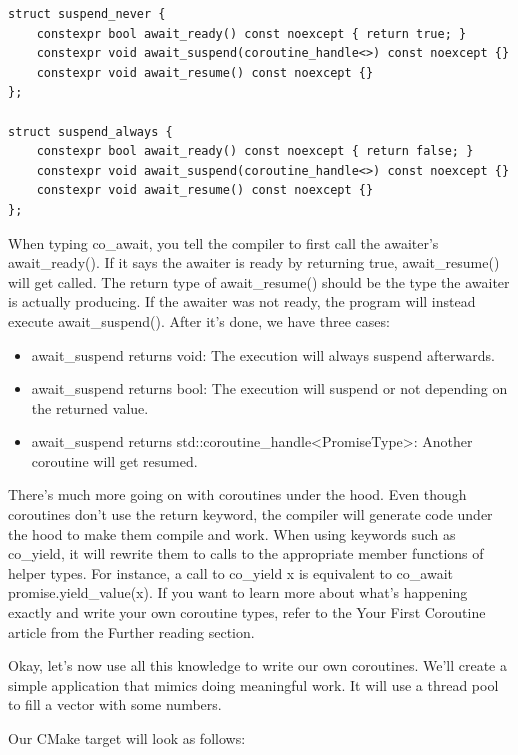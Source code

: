 \begin{lstlisting}[style=styleCXX]
struct suspend_never {
	constexpr bool await_ready() const noexcept { return true; }
	constexpr void await_suspend(coroutine_handle<>) const noexcept {}
	constexpr void await_resume() const noexcept {}
};

struct suspend_always {
	constexpr bool await_ready() const noexcept { return false; }
	constexpr void await_suspend(coroutine_handle<>) const noexcept {}
	constexpr void await_resume() const noexcept {}
};
\end{lstlisting}

When typing co\_await, you tell the compiler to first call the awaiter's await\_ready(). If it says the awaiter is ready by returning true, await\_resume() will get called. The return type of await\_resume() should be the type the awaiter is actually producing. If the awaiter was not ready, the program will instead execute await\_suspend(). After it's done, we have three cases:

\begin{itemize}
\item 
await\_suspend returns void: The execution will always suspend afterwards.

\item 
await\_suspend returns bool: The execution will suspend or not depending on the returned value.

\item 
await\_suspend returns std::coroutine\_handle<PromiseType>: Another coroutine will get resumed.
\end{itemize}

There's much more going on with coroutines under the hood. Even though coroutines don't use the return keyword, the compiler will generate code under the hood to make them compile and work. When using keywords such as co\_yield, it will rewrite them to calls to the appropriate member functions of helper types. For instance, a call to co\_yield x is equivalent to co\_await promise.yield\_value(x). If you want to learn more about what's happening exactly and write your own coroutine types, refer to the Your First Coroutine article from the Further reading section.

Okay, let's now use all this knowledge to write our own coroutines. We'll create a simple application that mimics doing meaningful work. It will use a thread pool to fill a vector with some numbers.

Our CMake target will look as follows:

